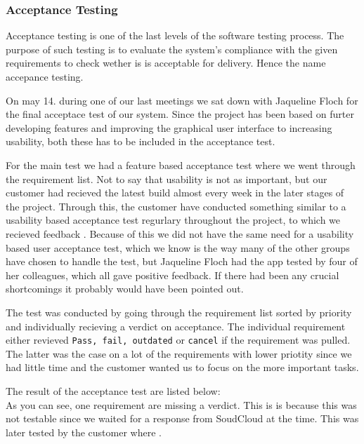 \subsubsection{Acceptance Testing}
Acceptance testing is one of the last levels of the software testing process. The purpose of such testing is to evaluate the system's compliance with the given requirements to check wether is is acceptable for delivery. Hence the name accepance testing.

On may 14. during one of our last meetings we sat down with Jaqueline Floch for the final acceptace test of our system. Since the project has been based on furter developing features and improving the graphical user interface to increasing usability, both these has to be included in the acceptance test.

For the main test we had a feature based acceptance test where we went through the requirement list. Not to say that usability is not as important, but our customer had recieved the latest build almost every week in the later stages of the project. Through this, the customer have conducted something similar to a usability based acceptance test regurlary throughout the project, to which we recieved feedback . Because of this we did not have the same need for a usability based user acceptance test, which we know is the way many of the other groups have chosen to handle the test, but Jaqueline Floch had the app tested by four of her colleagues, which all gave positive feedback. If there had been any crucial shortcomings it probably would have been pointed out.

The test was conducted by going through the requirement list sorted by priority and individually recieving a verdict on acceptance. The individual requirement either revieved \texttt{Pass, fail, outdated} or \texttt{cancel} if the requirement was pulled. The latter was the case on a lot of the requirements with lower priotity since we had little time and the customer wanted us to focus on the more important tasks.

The result of the acceptance test are listed below:\\



As you can see, one requirement are missing a verdict. This is is because this was not testable since we waited for a response from SoudCloud at the time. This was later tested by the customer where .


